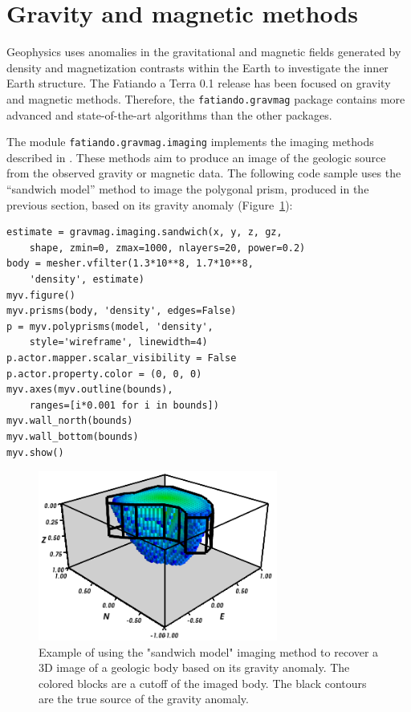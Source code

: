 \section{Gravity and magnetic methods}

Geophysics uses anomalies in the gravitational and magnetic fields
generated by density and magnetization contrasts within the Earth to
investigate the inner Earth structure. The Fatiando a Terra 0.1 release
has been focused on gravity and magnetic methods. Therefore, the
\texttt{fatiando.gravmag} package contains more advanced and
state-of-the-art algorithms than the other packages.

The module \texttt{fatiando.gravmag.imaging} implements the imaging methods
described in \citet{fedi2012}. These methods aim to produce an image of the
geologic source from the observed gravity or magnetic data. The following code
sample uses the ``sandwich model'' method \citep{pedersen1991} to image the
polygonal prism, produced in the previous section, based on its gravity anomaly
(Figure~\ref{fig:p1-imaging}):

\begin{verbatim}
estimate = gravmag.imaging.sandwich(x, y, z, gz,
    shape, zmin=0, zmax=1000, nlayers=20, power=0.2)
body = mesher.vfilter(1.3*10**8, 1.7*10**8,
    'density', estimate)
myv.figure()
myv.prisms(body, 'density', edges=False)
p = myv.polyprisms(model, 'density',
    style='wireframe', linewidth=4)
p.actor.mapper.scalar_visibility = False
p.actor.property.color = (0, 0, 0)
myv.axes(myv.outline(bounds),
    ranges=[i*0.001 for i in bounds])
myv.wall_north(bounds)
myv.wall_bottom(bounds)
myv.show()
\end{verbatim}

\begin{figure}
    \centering
    \includegraphics[width=0.7\textwidth]{figures/paper-fatiando/gravmag_imaging}
    \caption{
        Example of using the "sandwich model" imaging method to recover a 3D
        image of a geologic body based on its gravity anomaly. The colored
        blocks are a cutoff of the imaged body. The black contours are the true
        source of the gravity anomaly.
    }
    \label{fig:p1-imaging}
\end{figure}

